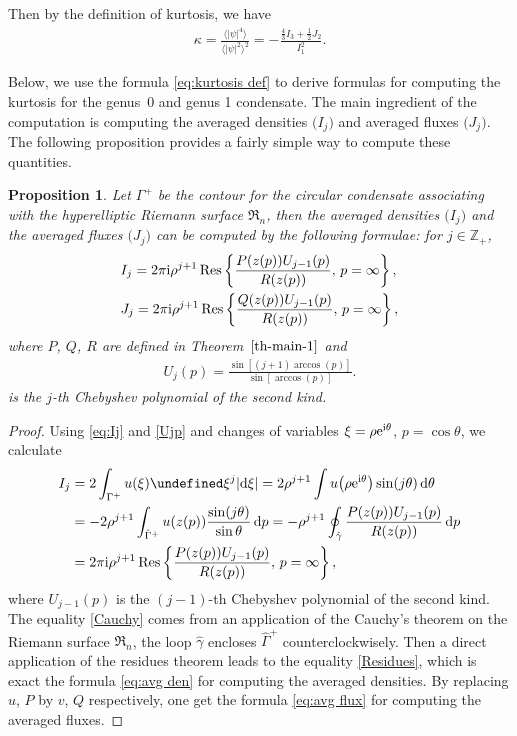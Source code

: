 \documentclass[pdftex]{sigma}
\numberwithin{equation}{section}
\newtheorem{Proposition}[Theorem]{Proposition}
\let\Im\undefined
\DeclareMathOperator{\Im}{Im}
\newcommand{\G}{\Gamma}
\newcommand{\Res}{\operatorname{Res}}
\def\G{\Gamma}
\begin{document}
Then by the definition of kurtosis, we have
\begin{align}
\kappa=\frac{\bigl\langle|\psi|^4\bigr\rangle}{\bigl\langle|\psi|^2\bigr\rangle^2}=-\frac{\frac{4}{3}I_3+\frac{1}{2}J_2}{I_1^2}.\label{eq:kurtosis def}
\end{align}

Below, we use the formula \eqref{eq:kurtosis def} to derive formulas for computing the kurtosis for the genus~0 and genus 1 condensate. The main ingredient of the computation is computing the averaged densities $\bigl(I_j\bigr)$ and averaged fluxes $\bigl(J_j\bigr)$. The following proposition provides a fairly simple way to compute these quantities.

\begin{Proposition}\label{prop:avg den}
Let $\G^+$ be the contour for the circular condensate associating with the hyperelliptic Riemann surface $\mathfrak{R}_n$, then the averaged densities $\bigl(I_j\bigr)$ and the averaged fluxes $\bigl(J_j\bigr)$ can be computed by the following formulae: for $j\in \mathbb{Z}_+$,
\begin{align}
&I_j=2\pi {\rm i} \rho^{j+1}\Res\left\{\frac{P(z(p))U_{j-1}(p)}{R(z(p))},\,p=\infty\right\},\label{eq:avg den}\\
&J_j=2\pi {\rm i} \rho^{j+1}\Res\left\{\frac{Q(z(p))U_{j-1}(p)}{R(z(p))},\,p=\infty\right\},\label{eq:avg flux}
\end{align}
where $P$, $Q$, $R$ are defined in Theorem~$\ref{th-main-1}$ and
\begin{align}\label{Ujp}
U_j(p)=\frac{\sin[(j+1)\arccos(p)]}{\sin[\arccos(p)]}.
\end{align}
is the $j$-th Chebyshev polynomial of the second kind.
\end{Proposition}
\begin{proof}
Using \eqref{eq:Ij} and \eqref{Ujp} and changes of variables $\xi=\rho {\rm e}^{{\rm i}\theta}$, $p=\cos\theta$, we calculate
\begin{align}
I_j&= 2\int_{\G^+}u(\xi)\Im \xi^j|{\rm d}\xi|
=2\rho^{j+1}\int u\bigl(\rho {\rm e}^{{\rm i} \theta}\bigr)\sin(j\theta) \,{\rm d}\theta
\nonumber\\
& = -2\rho^{j+1}\int_{\hat\G^+}u(z(p))\frac{\sin(j\theta)}{\sin\theta}\,{\rm d}p
=-\rho^{j+1}\oint_{\hat\gamma}\frac{P(z(p))U_{j-1}(p)}{R(z(p))}\,{\rm d}p\label{Cauchy}\\
&= 2\pi {\rm i} \rho^{j+1}\Res\left\{\frac{P(z(p))U_{j-1}(p)}{R(z(p))},\,p=\infty\right\}\label{Residues},
\end{align}
where $U_{j-1}(p)$ is the $(j-1)$-th Chebyshev polynomial of the second kind. The equality \eqref{Cauchy} comes from an application of the Cauchy's theorem on the Riemann surface $\mathfrak{R}_n$, the loop $\hat \gamma$ encloses $\hat\G^+$ counterclockwisely. Then a direct application of the residues theorem leads to the equality \eqref{Residues}, which is exact the formula \eqref{eq:avg den} for computing the averaged densities. By replacing $u$, $P$ by $v$, $Q$ respectively, one get the formula \eqref{eq:avg flux} for computing the averaged fluxes.
\end{proof}
\end{document}
